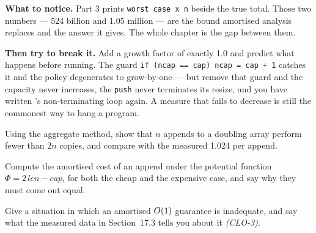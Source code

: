 \begin{lab}
\textbf{What to notice.} Part 3 prints \texttt{worst case x n} beside the true
total. Those two numbers --- 524 billion and 1.05 million --- are the bound
amortised analysis replaces and the answer it gives. The whole chapter is the
gap between them.

\smallskip
\textbf{Then try to break it.} Add a growth factor of exactly 1.0 and predict
what happens before running. The guard \texttt{if (ncap == cap) ncap = cap + 1}
catches it and the policy degenerates to grow-by-one --- but remove that guard
and the capacity never increases, the \texttt{push} never terminates its
resize, and you have written 's non-terminating loop again. A
measure that fails to decrease is still the commonest way to hang a program.
\end{lab}

\begin{checkpoint}
\begin{tightnum}
  \item Using the aggregate method, show that $n$ appends to a doubling array
        perform fewer than $2n$ copies, and compare with the measured 1.024 per
        append.
  \item Compute the amortised cost of an append under the potential function
        $\Phi = 2\,\mathit{len} - \mathit{cap}$, for both the cheap and the
        expensive case, and say why they must come out equal.
  \item Give a situation in which an amortised $O(1)$ guarantee is
        inadequate, and say what the measured data in Section~17.3 tells you
        about it \emph{(CLO-3)}.
\end{tightnum}
\end{checkpoint}

